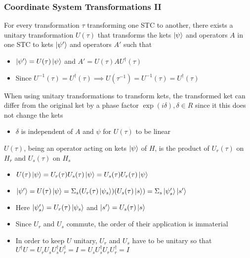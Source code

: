 \documentclass[8pt,t,mathserif,aspectratio=169]{beamer}
\begin{document}
\begin{frame}
  \frametitle{Coordinate System Transformations II}
  \vspace{1mm}
  For every transformation $\tau$ transforming one STC to another, there exists a unitary transformation $U(\tau)$ that transforms the kets $\ket{\psi}$ and operators $A$ in one STC to kets $\ket{\psi'}$ and operators $A'$ such that
  \begin{itemize}
    \item $\ket{\psi'} = U(\tau) \ket{\psi}$ and $A' = U(\tau) A U^{\dagger}(\tau)$
    \item Since $U^{-1}(\tau) = U^{\dagger}(\tau) \implies U(\tau^{-1}) = U^{-1}(\tau) = U^{\dagger}(\tau)$
  \end{itemize}
  When using unitary transformations to transform kets, the transformed ket can differ from the original ket by a phase factor $\exp(i \delta), \delta \in R$ since it this does not change the kets 
  \begin{itemize}
    \item $\delta$ is independent of $A$ and $\psi$ for $U(\tau)$ to be linear
  \end{itemize}
  $U(\tau)$, being an operator acting on kets $\ket{\psi}$ of $H$, is the product of $U_r(\tau)$ on $H_r$ and $U_s(\tau)$ on $H_s$
  \begin{itemize}
    \item $U(\tau) \ket{\psi} = U_r(\tau) U_s(\tau) \ket{\psi} = U_s(\tau) U_r(\tau) \ket{\psi}$
    \item $\ket{\psi'} = U(\tau) \ket{\psi} = \Sigma_s (U_r(\tau) \ket{\psi_s}) (U_s(\tau) \ket{s}) = \Sigma_s \ket{\psi'_s} \ket{s'}$
    \item Here $\ket{\psi'_s} = U_r(\tau) \ket{\psi_s}$ and $\ket{s'} = U_s(\tau) \ket{s}$
    \item Since $U_r$ and $U_s$ commute, the order of their application is immaterial
    \item In order to keep $U$ unitary, $U_r$ and $U_s$ have to be unitary so that $U^{\dagger} U = U_r U_s U^{\dagger}_s U^{\dagger}_r = I = U_s U^{\dagger}_s U_r U^{\dagger}_r = I$
  \end{itemize}
\end{frame}
\end{document}
